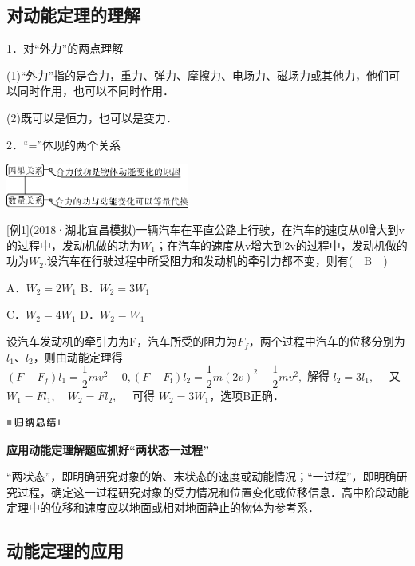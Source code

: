\documentclass[cn,10.5pt,chinese,mac,chinesefont=founder]{elegantbook}
\begin{document}
\newpage
\subsection{对动能定理的理解}

1．对``外力''的两点理解

(1)``外力''指的是合力，重力、弹力、摩擦力、电场力、磁场力或其他力，他们可以同时作用，也可以不同时作用．

(2)既可以是恒力，也可以是变力．

2．``=''体现的两个关系

\begin{center}\includegraphics[width=2.37708in,height=0.56597in]{media/image223.png}\end{center}

{[}例1{]}(2018·湖北宜昌模拟)一辆汽车在平直公路上行驶，在汽车的速度从0增大到v的过程中，发动机做的功为$W_1$；在汽车的速度从v增大到2v的过程中，发动机做的功为$W_2$.设汽车在行驶过程中所受阻力和发动机的牵引力都不变，则有(　B　)

A．$W_2=2W_1$ B．$W_2=3W_1$

C．$W_2=4W_1$ D．$W_2=W_1$

\begin{solution}
	设汽车发动机的牵引力为F，汽车所受的阻力为$F_f$，两个过程中汽车的位移分别为$l_1$、$l_2$，则由动能定理得$(F-F_f)l_1=\dfrac{1}{2} m v^{2}-0,\left(F-F_{\mathrm{f}}\right) l_{2}=\dfrac{1}{2} m(2 v)^{2}-\dfrac{1}{2} m v^{2},$ 解得 $l_{2}=3 l_{1}, \quad$ 又 $W_{1}=F l_{1}, \quad W_{2}=F l_{2}, \quad$ 可得 $W_{2}=3 W_{1}$，选项B正确．
\end{solution}
\begin{center}\includegraphics[width=0.70764in,height=0.12292in]{media/image13.png}

\textbf{应用动能定理解题应抓好``两状态一过程''}
\end{center}


``两状态''，即明确研究对象的始、末状态的速度或动能情况；``一过程''，即明确研究过程，确定这一过程研究对象的受力情况和位置变化或位移信息．高中阶段动能定理中的位移和速度应以地面或相对地面静止的物体为参考系．


\subsection{动能定理的应用}
\end{document}
